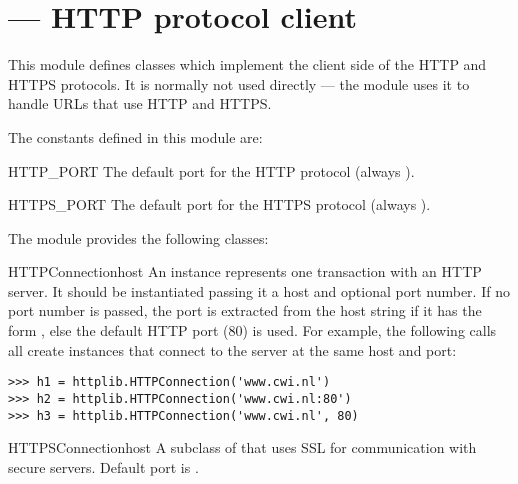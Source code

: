 \section{ ---
         HTTP protocol client}



This module defines classes which implement the client side of the
HTTP and HTTPS protocols.  It is normally not used directly --- the
module  uses it to handle URLs
that use HTTP and HTTPS.  

The constants defined in this module are:

\begin{datadesc}{HTTP_PORT}
  The default port for the HTTP protocol (always ).
\end{datadesc}

\begin{datadesc}{HTTPS_PORT}
  The default port for the HTTPS protocol (always ).
\end{datadesc}

The module provides the following classes:

\begin{classdesc}{HTTPConnection}{host}
An  instance represents one transaction with an HTTP
server.  It should be instantiated passing it a host and optional port number.
If no port number is passed, the port is extracted from the host string if it
has the form , else the default HTTP port (80) is
used.  For example, the following calls all create instances that connect to
the server at the same host and port:

\begin{verbatim}
>>> h1 = httplib.HTTPConnection('www.cwi.nl')
>>> h2 = httplib.HTTPConnection('www.cwi.nl:80')
>>> h3 = httplib.HTTPConnection('www.cwi.nl', 80)
\end{verbatim}
\end{classdesc}

\begin{classdesc}{HTTPSConnection}{host}
A subclass of  that uses SSL for communication with
secure servers.  Default port is .
\end{classdesc}

